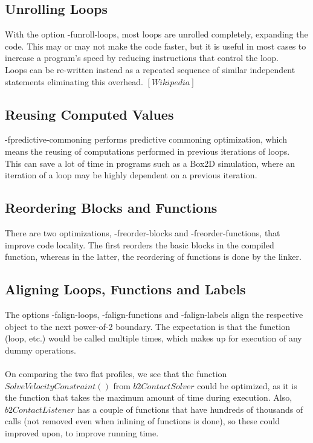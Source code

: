 \documentclass[a4paper,11pt]{article}
\begin{document}
\subsection*{Unrolling Loops}
With the option -funroll-loops, most loops are unrolled completely, expanding the code. This may or may not make the code faster, but it is useful in most cases to increase a program's speed by reducing instructions that control the loop.\\
Loops can be re-written instead as a repeated sequence of similar independent statements eliminating this overhead. $[Wikipedia]$

\subsection*{Reusing Computed Values}
-fpredictive-commoning performs predictive commoning optimization, which means the reusing of computations performed in previous iterations of loops.\\
This can save a lot of time in programs such as a Box2D simulation, where an iteration of a loop may be highly dependent on a previous iteration.

\subsection*{Reordering Blocks and Functions}
There are two optimizations, -freorder-blocks and -freorder-functions, that improve code locality. The first reorders the basic blocks in the compiled function, whereas in the latter, the reordering of functions is done by the linker.

\subsection*{Aligning Loops, Functions and Labels}
The options -falign-loops, -falign-functions and -falign-labels align the respective object to the next power-of-2 boundary. The expectation is that the function (loop, etc.) would be called multiple times, which makes up for execution of any dummy operations.\\\\
On comparing the two flat profiles, we see that the function $SolveVelocityConstraint()$ from $b2ContactSolver$ could be optimized, as it is the function that takes the maximum amount of time during execution.
Also, $b2ContactListener$ has a couple of functions that have hundreds of thousands of calls (not removed even when inlining of functions is done), so these could improved upon, to improve running time.
\end{document}
